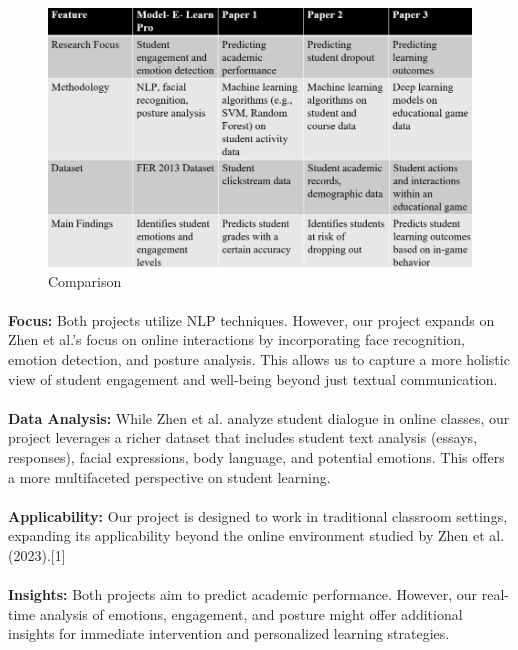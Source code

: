 \begin{figure}[!ht]
\centering
\includegraphics[width=125mm]{ss final.png}
\caption{Comparison}
\end{figure} 

\paragraph{} \textbf{Focus:} Both projects utilize NLP techniques. However, our project expands on Zhen et al.'s focus on online interactions by incorporating face recognition, emotion detection, and posture analysis. This allows us to capture a more holistic view of student engagement and well-being beyond just textual communication.

\paragraph{} \textbf{Data Analysis:}  While Zhen et al. analyze student dialogue in online classes, our project leverages a richer dataset that includes student text analysis (essays, responses), facial expressions, body language, and potential emotions. This offers a more multifaceted perspective on student learning.
\paragraph{} \textbf{Applicability:}  Our project is designed to work in traditional classroom settings, expanding its applicability beyond the online environment studied by Zhen et al. (2023).[1]

\paragraph{} \textbf{Insights:} Both projects aim to predict academic performance. However, our real-time analysis of emotions, engagement, and posture might offer additional insights for immediate intervention and personalized learning strategies.

